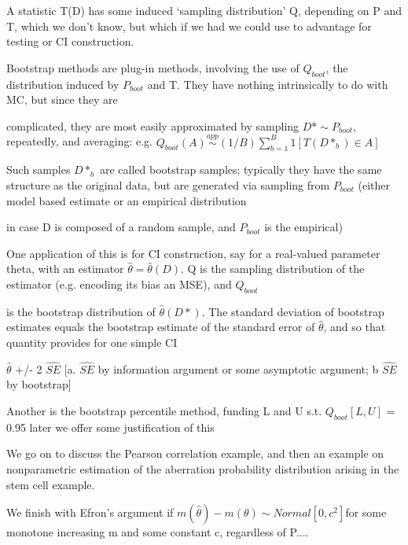 \documentclass[11pt,a4paper]{article}
\begin{document}
	A statistic T(D) has some induced `sampling distribution' Q, depending on P and T, which we don't know, but which if we had we could use to advantage for testing or CI construction.
	
	Bootstrap methods are plug-in methods, involving the use of $Q_{boot}$, the distribution induced by $P_{boot}$ and T.   They have nothing intrinsically to do with MC, but since they are
	
	complicated, they are most easily approximated by sampling $D* \sim P_{boot}$, repeatedly, and averaging: e.g.  $Q_{boot}(A) \stackrel{app}{\sim} (1/B) \sum_{b=1}^B 1[ T(D*_b) \in A ]$
	
	Such samples $D*_b$ are called bootstrap samples; typically they have the same structure as the original data, but are generated via sampling from $P_{boot}$ (either model based estimate or an empirical distribution
	
	in case D is composed of a random sample, and $P_{boot}$ is the empirical)
	
	One application of this is for CI construction, say for a real-valued parameter theta, with an estimator $\hat{\theta} = \hat{\theta}(D)$.  Q is the sampling distribution of the estimator (e.g. encoding its bias an MSE), and $Q_{boot}$
	
	is the bootstrap distribution of $\hat{\theta}(D*)$.   The standard deviation of bootstrap estimates equals the bootstrap estimate of the standard error of $\hat{\theta}$, and so that quantity provides for one simple CI
	
	$\hat{\theta}$ +/- 2 $\hat{SE}$       [a. $\hat{SE}$ by information argument or some asymptotic argument; b $\hat{SE}$ by bootstrap]
	
	Another is the bootstrap percentile method, funding L and U s.t. $Q_{boot}[L,U]$ = 0.95  { later we offer some justification of this }
	
	We go on to discuss the Pearson correlation example, and then an example on nonparametric estimation of the aberration probability distribution arising in the stem cell example.
	
	We finish with Efron's argument if $m(\hat{\theta}) - m(\theta) \sim Normal[ 0, c^2 ] $for some monotone increasing m and some constant c, regardless of P....
\end{document}
